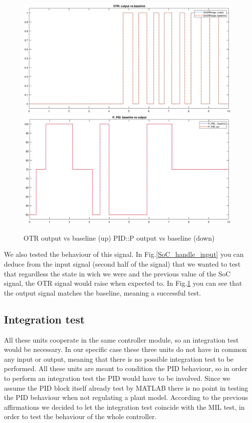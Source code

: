 \documentclass[12pt,a4paper]{report}
\begin{document}
\begin{figure}[!hbt]
	\centering
	\includegraphics[scale=0.4]{OTR_baseline_result.eps}\hfill
	\includegraphics[scale=0.4]{PidP_baseline_result.eps}
	\caption{OTR output vs baseline (up) PID::P output vs baseline (down)}
	\label{OTR_baseline_result}
\end{figure}
We also tested the behaviour of this signal. In Fig.\ref{SoC_handle_input} you can deduce from the input signal (second half of the signal) that we wanted to test that regardless the state in wich we were and the previous value of the SoC signal, the OTR signal would raise when expected to.
In Fig.\ref{OTR_baseline_result} you can see that the output signal matches the baseline, meaning a successful test.
\FloatBarrier
\subsection{Integration test}
All these units cooperate in the same controller module, so an integration test would be necessary. In our specific case these three units do not have in common any input or output, meaning that there is no possible integration test to be performed. All these units are meant to condition the PID behaviour, so in order to perform an integration test the PID would have to be involved. Since we assume the PID block itself already test by MATLAB there is no point in testing the PID behaviour when not regulating a plant model.
According to the previous affirmations we decided to let the integration test coincide with the MIL test, in order to test the behaviour of the whole controller.
\end{document}
